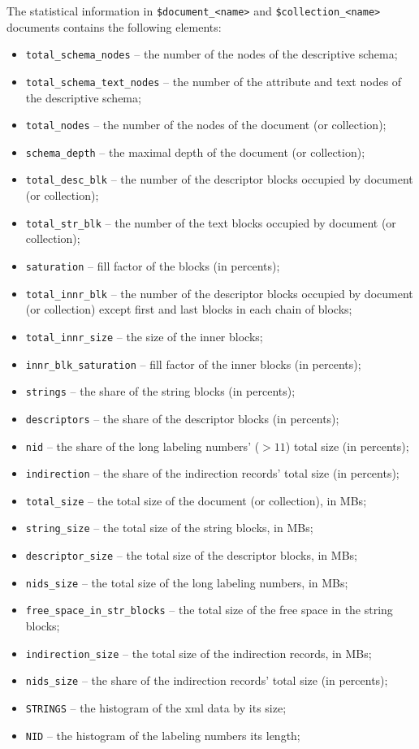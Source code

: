 \documentclass[a4paper,12pt]{article}
\newenvironment{citemize}
{\begin{itemize}
  \setlength{\itemsep}{0pt}
  \setlength{\parskip}{0pt}
  \setlength{\parsep}{0pt}}
{\end{itemize}}
\begin{document}
The statistical information in \verb!$document_<name>! and
\verb!$collection_<name>! documents contains the following elements:

\begin{citemize}
\item\verb!total_schema_nodes! -- the number of the nodes of the descriptive
schema;
\item\verb!total_schema_text_nodes! -- the number of the attribute and text
nodes of the descriptive schema;
\item\verb!total_nodes! -- the number of the nodes of the document (or
collection);
\item\verb!schema_depth! -- the maximal depth of the document (or collection);
\item\verb!total_desc_blk! -- the number of the descriptor blocks occupied by
document (or collection);
\item\verb!total_str_blk! -- the number of the text blocks occupied by document
(or collection);
\item\verb!saturation! -- fill factor of the blocks (in percents);
\item\verb!total_innr_blk! -- the number of the descriptor blocks occupied by
document (or collection) except first and last blocks in each chain of blocks;
\item\verb!total_innr_size! -- the size of the inner blocks;
\item\verb!innr_blk_saturation! -- fill factor of the inner blocks (in
percents);
\item\verb!strings! -- the share of  the string blocks (in percents);
\item\verb!descriptors! -- the share of  the descriptor blocks (in percents);
\item\verb!nid! -- the share of the long labeling numbers' ($>11$) total size
(in percents);
\item\verb!indirection! -- the share of the indirection records' total size (in
percents);
\item\verb!total_size! -- the total size of the document (or collection), in
MBs;
\item\verb!string_size! -- the total size of the string blocks, in MBs;
\item\verb!descriptor_size! -- the total size of the descriptor blocks, in MBs;
\item\verb!nids_size! -- the total size of the long labeling numbers, in MBs;
\item\verb!free_space_in_str_blocks! -- the total size of the free space in the
string blocks;
\item\verb!indirection_size! -- the total size of the indirection records, in
MBs;
\item\verb!nids_size! -- the share of the indirection records' total size (in
percents);
\item\verb!STRINGS! -- the histogram of the xml data by its size;
\item\verb!NID! -- the histogram of the labeling numbers its length;
\end{citemize}
\end{document}
